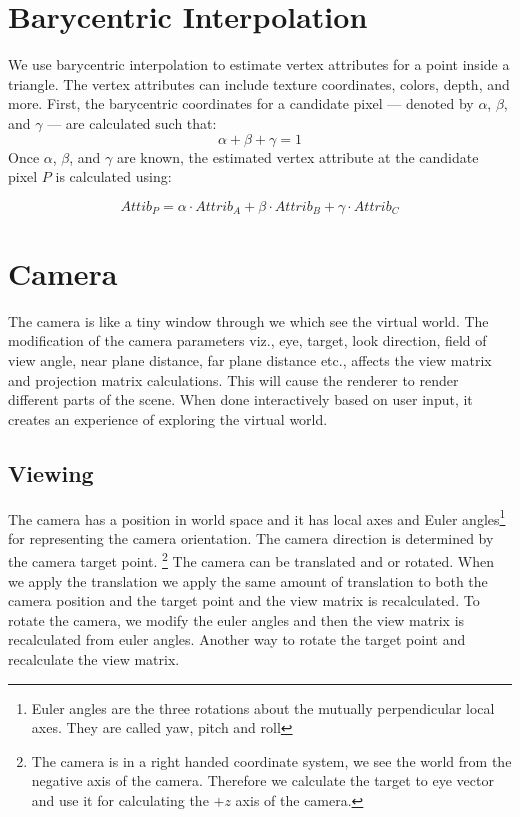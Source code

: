 \section{Barycentric Interpolation}
We use barycentric interpolation to estimate vertex attributes for a point inside a triangle.  
The vertex attributes can include texture coordinates, colors,  depth, and more.
First, the barycentric coordinates for a candidate pixel --- denoted by $\alpha$, $\beta$, and $\gamma$ --- are calculated such that:
\[
\alpha + \beta + \gamma = 1
\]
Once $\alpha$, $\beta$, and $\gamma$ are known, the estimated vertex attribute at the candidate pixel $P$ is calculated using:

\begin{equation}
Attib_P = \alpha \cdot Attrib_A + \beta \cdot Attrib_B + \gamma \cdot Attrib_C
\end{equation}


\section{Camera}
The camera is like a tiny window through we which see the virtual world. 
The modification of the camera parameters viz., eye, target, look direction, field of view angle, near plane distance, far plane distance etc., affects the view matrix and projection matrix calculations. This will cause the renderer to render different parts of the scene. When done interactively based on user input, it creates an experience of exploring  the virtual world.
\subsection{Viewing}
The camera has a position in world space and it has local axes and Euler angles\footnote{Euler angles are the three rotations about the mutually perpendicular local axes. They are called yaw, pitch and roll} for representing the camera orientation. The camera direction is determined by the camera target point. \footnote{The camera is in a right handed coordinate system, we see the world from the negative axis of the camera. Therefore we calculate the target to eye vector and use it for calculating the $+z$ axis of the camera.} The camera can be translated and or rotated.  When we apply the translation we apply the same amount of translation to both the camera position and the target point and the view matrix is recalculated. To rotate the camera, we modify the euler angles and then the view matrix is recalculated from euler angles. Another way to rotate the target point and recalculate the view matrix.

